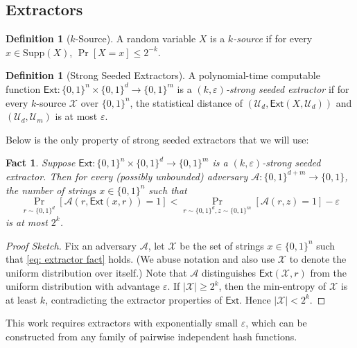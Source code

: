 \documentclass[10pt,a4paper]{article}
\newtheorem{fact}[theorem]{Fact}
\theoremstyle{definition}
\newtheorem{definition}[theorem]{Definition}
\theoremstyle{remark}
\newcommand{\eps}{\varepsilon}
\newcommand{\Ext}{\mathsf{Ext}}
\newcommand{\calA}{\mathcal{A}}
\newcommand{\calU}{\mathcal{U}}
\newcommand{\calX}{\mathcal{X}}
\begin{document}
\subsection{Extractors}
\begin{definition}[$k$-Source]
    A random variable $X$ is a \emph{$k$-source} if for every $x\in \mathrm{Supp}(X)$, $\Pr[X = x] \le 2^{-k}$.
\end{definition}

\begin{definition}[Strong Seeded Extractors]\label{def: comp-ext}	
    A polynomial-time computable function $\Ext: \{0, 1\}^n \times \{0, 1\}^d \to \{0, 1\}^m$ is a \emph{$(k, \eps)$-strong seeded extractor} if for every $k$-source $\calX$ over $\{0, 1\}^n$, the statistical distance of $(\calU_d, \Ext(X, \calU_d))$ and $(\calU_d, \calU_m)$ is at most $\eps$.
\end{definition}

Below is the only property of strong seeded extractors that we will use:

\begin{fact}
    Suppose $\Ext: \{0, 1\}^n \times \{0, 1\}^d \to \{0, 1\}^m$ is a $(k, \eps)$-strong seeded extractor. Then for every (possibly unbounded) adversary $\calA: \{0, 1\}^{d+m} \to \{0, 1\}$, the number of strings $x\in \{0, 1\}^n$ such that
	\begin{equation}\label{eq: extractor fact}
        \Pr_{r\sim \{0, 1\}^d}[\calA(r, \Ext(x, r)) = 1] < \Pr_{r\sim \{0, 1\}^d, z\sim \{0, 1\}^m}[\calA(r, z) = 1] - \eps
    \end{equation}
	is at most $2^k$.
\end{fact}
\begin{proof}[Proof Sketch]
	Fix an adversary $\calA$, let $\calX$ be the set of strings $x \in \{0, 1\}^n$ such that \eqref{eq: extractor fact} holds. (We abuse notation and also use $\calX$ to denote the uniform distribution over itself.) Note that $\calA$ distinguishes $\Ext(\calX, r)$ from the uniform distribution with advantage $\eps$. If $|\calX| \ge 2^k$, then the min-entropy of $\calX$ is at least $k$, contradicting the extractor properties of $\Ext$. Hence $|\calX| < 2^k$.
\end{proof}

This work requires extractors with exponentially small $\eps$, which can be constructed from any family of pairwise independent hash functions.
\end{document}
